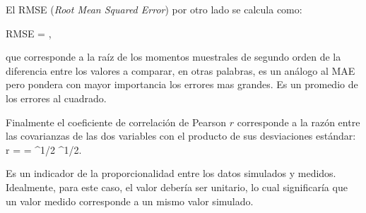 El RMSE (\emph{Root Mean Squared Error}) por otro lado se calcula como:

\be 
RMSE = ,
\ee

que corresponde a la raíz de los momentos muestrales de segundo orden de la diferencia entre los valores a comparar, en otras palabras, es un análogo al MAE pero pondera con mayor importancia los errores mas grandes. Es un promedio de los errores al cuadrado.

Finalmente el coeficiente de correlación de Pearson $r$ corresponde a la razón entre las covarianzas de las dos variables con el producto de sus desviaciones estándar:
\be 
r =  =  {\left[\sum\limits_{i=1}^n (x_i-\overline{x})^2\right]^{1/2} \left[\sum\limits_{i=1}^n (y_i-\overline{y})^2\right]^{1/2}}.
\ee

Es un indicador de la proporcionalidad entre los datos simulados y medidos. Idealmente, para este caso, el valor debería ser unitario, lo cual significaría que un valor medido corresponde a un mismo valor simulado.